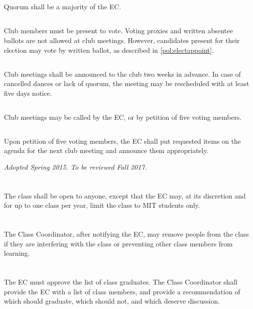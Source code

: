 \documentclass{bylaws}
\newcommand{\sptimes}[2]{\emph{Adopted #1. To be reviewed #2.}}
\begin{document}
\subsection{}Quorum shall be a majority of the EC.

\subsection{}Club members must be present to vote. Voting proxies and written absentee ballots are not allowed at club meetings. However, candidates present for their election may vote by written ballot, as described in \ref{pol:electappoint}.
\subsection{}Club meetings shall be announced to the club two weeks in advance. In case of cancelled dances or lack of quorum, the meeting may be rescheduled with at least five days notice.
\subsection{}Club meetings may be called by the EC, or by petition of five voting members.
\subsection{}Upon petition of five voting members, the EC shall put requested items on the agenda for the next club meeting and announce them appropriately.


\sptimes{Spring 2015}{Fall 2017}
\section{}The class shall be open to anyone, except that the EC may, at its discretion and for up to one class per year, limit the class to MIT students only.
\section{}The Class Coordinator, after notifying the EC, may remove people from the class if they are interfering with the class or preventing other class members from learning.
\section{}The EC must approve the list of class graduates. The Class Coordinator shall provide the EC with a list of class members, and provide a recommendation of which should graduate, which should not, and which deserve discussion.
\end{document}
